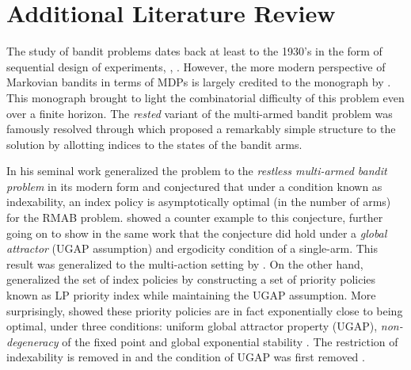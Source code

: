 
\section{Additional Literature Review}\label{apx:review}
The study of bandit problems dates back at least to the 1930's in the form of sequential design of experiments, \citep{Thompson33}, \citep{Wald:1947}. However, the more modern perspective of Markovian bandits in terms of MDPs is largely credited to the monograph by \citet{bellman1957dynamic}. This monograph brought to light the combinatorial difficulty of this problem even over a finite horizon. The \emph{rested} variant of the multi-armed bandit problem was famously resolved through \citet{Gittin79} which proposed a remarkably simple structure to the solution by allotting indices to the states of the bandit arms.

In his seminal work \citet{Wh88} generalized the problem to the \emph{restless multi-armed bandit problem} in its modern form and conjectured that under a condition known as indexability, an index policy is asymptotically optimal (in the number of arms) for the RMAB problem. \citet{WW90} showed a counter example to this conjecture, further going on to show in the same work that the conjecture did hold under a \emph{global attractor} (UGAP assumption) and ergodicity condition of a single-arm. This result was generalized to the multi-action setting by \citet{Glazebrook15}. On the other hand, \citet{verloop2016asymptotically, GGY23b} generalized the set of index policies by constructing a set of priority policies known as LP priority index while maintaining the UGAP assumption. More surprisingly, \citet{GGY23, GGY23b} showed these priority policies are in fact exponentially close to being optimal, under three conditions: uniform global attractor property (UGAP), \emph{non-degeneracy} of the fixed point and global exponential stability \cite{GGY23}. The restriction of indexability is removed in \cite{GGY23b} and the condition of UGAP was first removed \cite{HXCW24}.

